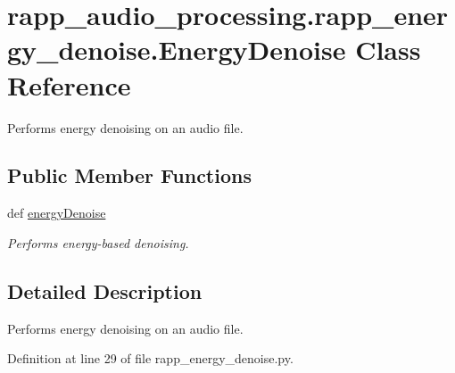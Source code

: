 \hypertarget{classrapp__audio__processing_1_1rapp__energy__denoise_1_1EnergyDenoise}{\section{rapp\-\_\-audio\-\_\-processing.\-rapp\-\_\-energy\-\_\-denoise.\-Energy\-Denoise Class Reference}
\label{classrapp__audio__processing_1_1rapp__energy__denoise_1_1EnergyDenoise}
}


Performs energy denoising on an audio file.  


\subsection*{Public Member Functions}
\begin{DoxyCompactItemize}
\item 
def \hyperlink{classrapp__audio__processing_1_1rapp__energy__denoise_1_1EnergyDenoise_a9570921c510763a72bf44ad64a41708f}{energy\-Denoise}
\begin{DoxyCompactList}\small\item\em Performs energy-\/based denoising. \end{DoxyCompactList}\end{DoxyCompactItemize}


\subsection{Detailed Description}
Performs energy denoising on an audio file. 

Definition at line 29 of file rapp\-\_\-energy\-\_\-denoise.\-py.



